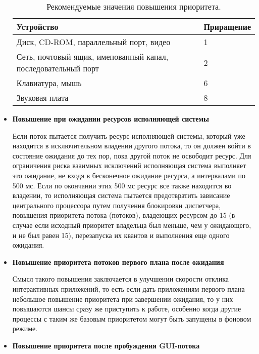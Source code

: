 \begin{itemize}
    \begin{table}[h]
    \caption{Рекомендуемые значения повышения приоритета.}
    \begin{center}
        \begin{tabular}{|p{100mm}|l|}
            \hline
            \textbf{Устройство} & \textbf{Приращение} \\
            \hline
            Диск, CD-ROM, параллельный порт, видео & 1 \\
            \hline
            Сеть, почтовый ящик, именованный канал, последовательный порт & 2 \\
            \hline
            Клавиатура, мышь & 6 \\
            \hline
            Звуковая плата & 8 \\
            \hline
        \end{tabular}
    \end{center}
    \label{tab:io}
    \end{table}


    \item \textbf{Повышение при ожидании ресурсов исполняющей системы}
    
    Если поток пытается получить ресурс исполняющей системы, который уже находится в исключительном владении другого потока, то он должен войти в состояние ожидания до тех пор, пока другой поток не освободит ресурс. Для ограничения риска взаимных исключений исполняющая система выполняет это ожидание, не входя в бесконечное ожидание ресурса, а интервалами по 500 мс. Если по окончании этих 500 мс ресурс все также находится во владении, то исполняющая система пытается предотвратить зависание центрального процессора путем получения блокировки диспетчера, повышения приоритета потока (потоков), владеющих ресурсом до 15 (в случае если исходный приоритет владельца был меньше, чем у ожидающего, и не был равен 15), перезапуска их квантов и выполнения еще одного ожидания.

    \item \textbf{Повышение приоритета потоков первого плана после ожидания}
    
    Смысл такого повышения заключается в улучшении скорости отклика интерактивных приложений, то есть если дать приложениям первого плана небольшое повышение приоритета при завершении ожидания, то у них повышаются шансы сразу же приступить к работе, особенно когда другие процессы с таким же базовым приоритетом могут быть запущены в фоновом режиме.
    
    
    \item \textbf{Повышение приоритета после пробуждения GUI-потока}
    

\end{itemize}
